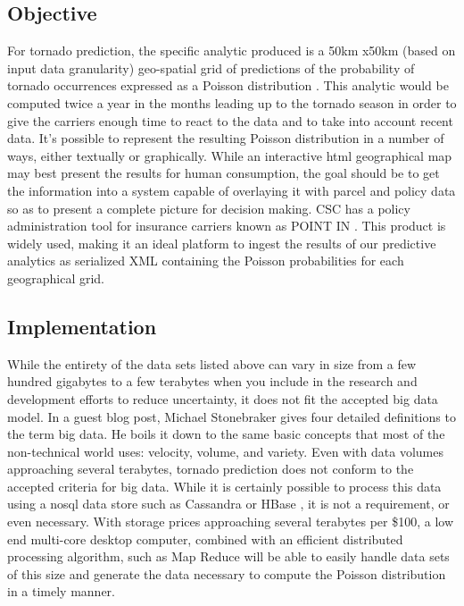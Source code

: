 \subsection{Objective}
For tornado prediction, the specific analytic produced is a 50km x50km (based on input data granularity) geo-spatial grid of predictions of the probability of tornado occurrences expressed as a Poisson distribution \cite{anderson}. This analytic would be computed twice a year in the months leading up to the tornado season in order to give the carriers enough time to react to the data and to take into account recent data. It's possible to represent the resulting Poisson distribution in a number of ways, either textually or graphically. While an interactive \gls{html} geographical map may best present the results for human consumption, the goal should be to get the information into a system capable of overlaying it with parcel and policy data so as to present a complete picture for decision making. \textsc{CSC} has a policy administration tool for insurance carriers known as POINT IN \cite{point_in}. This product is widely used, making it an ideal platform to ingest the results of our predictive analytics as serialized XML containing the Poisson probabilities for each geographical grid.
\subsection{Implementation}
While the entirety of the data sets listed above can vary in size from a few hundred gigabytes to a few terabytes when you include in the research and development efforts to reduce uncertainty, it does not fit the accepted big data model. In a guest blog post, Michael Stonebraker gives four detailed definitions to the term big data\cite{stonebraker}. He boils it down to the same basic concepts that most of the non-technical world uses: velocity, volume, and variety. Even with data volumes approaching several terabytes, tornado prediction does not conform to the accepted criteria for big data. While it is certainly possible to process this data using a \gls{nosql} data store such as Cassandra \cite{cassandra} or HBase \cite{Hbase}, it is not a requirement, or even necessary. With storage prices approaching several terabytes per \$100, a low end multi-core desktop computer, combined with an efficient distributed processing algorithm, such as Map Reduce \cite{mapreduce} will be able to easily handle data sets of this size and generate the data necessary to compute the Poisson distribution in a timely manner.
